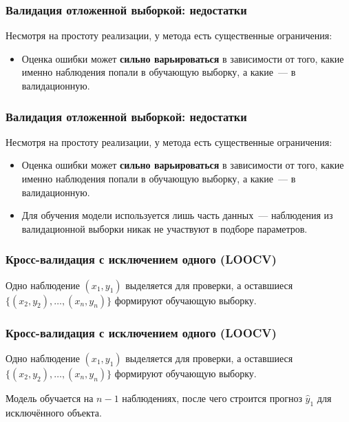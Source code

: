 \documentclass{beamer}
\begin{document}
\begin{frame}
  \frametitle{Валидация отложенной выборкой: недостатки}

  Несмотря на простоту реализации, у метода есть существенные ограничения:

  \begin{itemize}
    \item Оценка ошибки может \textbf{сильно варьироваться} в зависимости от того, какие именно наблюдения попали в обучающую выборку, а какие~--- в валидационную.
  \end{itemize}

\end{frame}

\begin{frame}
  \frametitle{Валидация отложенной выборкой: недостатки}

  Несмотря на простоту реализации, у метода есть существенные ограничения:

  \begin{itemize}
    \item Оценка ошибки может \textbf{сильно варьироваться} в зависимости от того, какие именно наблюдения попали в обучающую выборку, а какие~--- в валидационную.

    \item Для обучения модели используется лишь часть данных~--- наблюдения из валидационной выборки никак не участвуют в подборе параметров.
  \end{itemize}

\end{frame}


\begin{frame}
  \frametitle{Кросс-валидация с исключением одного (LOOCV)}

  Одно наблюдение $(x_1, y_1)$ выделяется для проверки, а оставшиеся $\{(x_2, y_2), \ldots, (x_n, y_n)\}$ формируют обучающую выборку.

\end{frame}

\begin{frame}
  \frametitle{Кросс-валидация с исключением одного (LOOCV)}

  Одно наблюдение $(x_1, y_1)$ выделяется для проверки, а оставшиеся $\{(x_2, y_2), \ldots, (x_n, y_n)\}$ формируют обучающую выборку.

  \vspace{0.3cm}

  Модель обучается на $n - 1$ наблюдениях, после чего строится прогноз $\hat{y}_1$ для исключённого объекта.

\end{frame}
\end{document}
